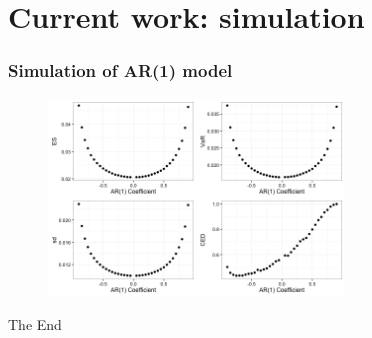 \documentclass{beamer}
\newcommand\Fontviii{\fontsize{8}{9.2}\selectfont}
\begin{document}
\section{Current work: simulation}
\begin{frame}
\frametitle{Simulation of AR(1) model}
\Fontviii

\begin{figure}[h]
\centering 
\includegraphics[width=0.7\textwidth]{../figures/AR1_simulation}
\label{fig: CED3mon2yr}
\end{figure}

\end{frame}


\begin{frame}
\Huge{\centerline{The End}}
\end{frame}

\end{document}
